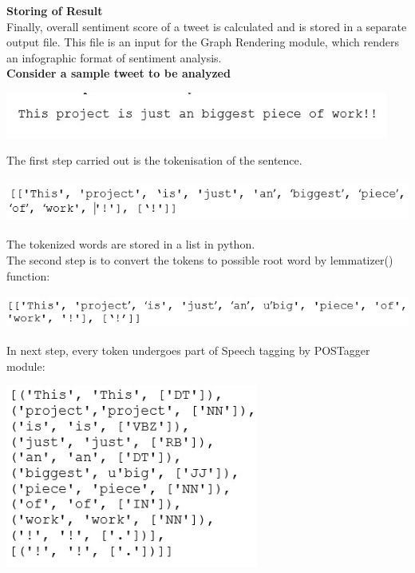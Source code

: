 \documentclass[a4paper,12pt]{report}
\begin{document}
\textbf{Storing of Result}\\ 
\hspace*{\parindent}	Finally, overall sentiment score of a tweet is calculated and is stored in a separate output file. This file is an input for the Graph Rendering module, which renders an infographic format of sentiment analysis.\\
\textbf{Consider a sample tweet to be analyzed }
\begin{center}
	\includegraphics[height=1.5cm]{images/1.jpg}
\end{center}
The first step carried out is the tokenisation of the sentence.
\begin{center}
	\includegraphics[height=1.4cm]{images/2.jpg}
\end{center}
\hspace*{\parindent}The tokenized words are stored in a list in python.\\
\hspace*{\parindent}The second step is to convert the tokens to possible root word by lemmatizer() function:
\begin{center}
	\includegraphics[height=1.1cm]{images/3.jpg}
\end{center}
\hspace*{\parindent}In next step, every token undergoes part of Speech tagging by POSTagger module:
\begin{center}
	\includegraphics[height=6cm]{images/4.jpg}
\end{center}
\end{document}
